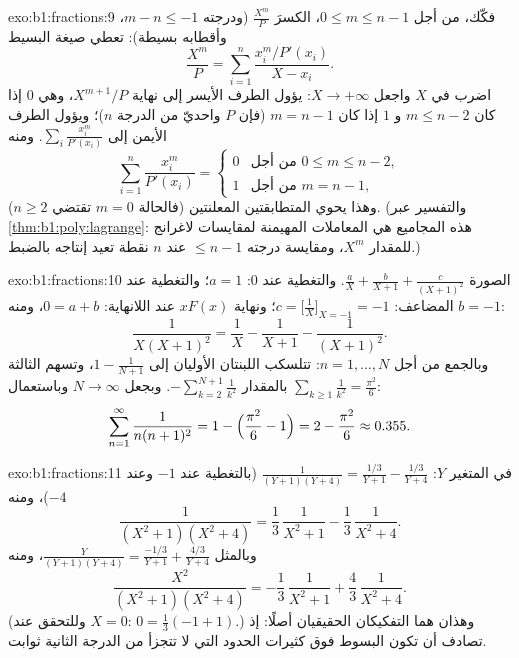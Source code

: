 \begin{solution}{exo:b1:fractions:9}
فكّك، من أجل $0 \leq m \leq n - 1$، الكسرَ $\frac{X^m}{P}$
(ودرجته $m - n \leq -1$، وأقطابه بسيطة): تعطي صيغة  البسيط
\[
\frac{X^m}{P} = \sum_{i=1}^{n} \frac{x_i^m / P'(x_i)}{X - x_i} .
\]
اضرب في $X$ واجعل $X \to +\infty$: يؤول الطرف الأيسر إلى
نهاية $X^{m+1}/P$، وهي $0$ إذا كان $m \leq n - 2$ و $1$ إذا كان $m =
n - 1$ (فإن $P$ واحديّ من الدرجة $n$)؛ ويؤول الطرف الأيمن إلى
$\sum_i \frac{x_i^m}{P'(x_i)}$. ومنه
\[
\sum_{i=1}^{n} \frac{x_i^{m}}{P'(x_i)} =
\begin{cases}
0 & \text{من أجل } 0 \leq m \leq n-2,\\
1 & \text{من أجل } m = n - 1,
\end{cases}
\]
وهذا يحوي المتطابقتين المعلنتين (فالحالة $m = 0$ تقتضي $n \geq
2$). (والتفسير عبر \cref{thm:b1:poly:lagrange}: هذه المجاميع هي
المعاملات المهيمنة لمقايسات لاغرانج للمقدار $X^m$، ومقايسة
 درجته $\leq n-1$ عند $n$ نقطة
تعيد إنتاجه بالضبط.)
\end{solution}

\begin{solution}{exo:b1:fractions:10}
الصورة $\frac aX + \frac b{X+1} + \frac c{(X+1)^2}$. والتغطية عند
$0$: $a = 1$؛ والتغطية عند  المضاعف: $c = \bigl[\frac1X
\bigr]_{X=-1} = -1$؛ ونهاية $xF(x)$ عند اللانهاية: $0 = a + b$، ومنه
$b = -1$:
\[
\frac{1}{X(X+1)^2} = \frac1X - \frac1{X+1} - \frac1{(X+1)^2} .
\]
وبالجمع من أجل $n = 1, \dots, N$: تتلسكب اللبنتان الأوليان إلى
$1 - \frac1{N+1}$، وتسهم الثالثة بالمقدار $-\sum_{k=2}^{N+1}
\frac1{k^2}$. وبجعل $N \to \infty$ وباستعمال $\sum_{k\geq1}
\frac1{k^2} = \frac{\pi^2}6$:
\[
\sum_{n=1}^{\infty}\frac{1}{n(n+1)^2}
= 1 - \Bigl(\frac{\pi^2}6 - 1\Bigr) = 2 - \frac{\pi^2}6
\approx 0.355 .
\]
\end{solution}

\begin{solution}{exo:b1:fractions:11}
في المتغير $Y$: $\frac1{(Y+1)(Y+4)} = \frac{1/3}{Y+1} -
\frac{1/3}{Y+4}$ (بالتغطية عند $-1$ وعند $-4$)، ومنه
\[
\frac{1}{(X^2+1)(X^2+4)}
= \frac13\,\frac1{X^2+1} - \frac13\,\frac1{X^2+4} .
\]
وبالمثل $\frac{Y}{(Y+1)(Y+4)} = \frac{-1/3}{Y+1} +
\frac{4/3}{Y+4}$، ومنه
\[
\frac{X^2}{(X^2+1)(X^2+4)}
= -\frac13\,\frac1{X^2+1} + \frac43\,\frac1{X^2+4} .
\]
(وللتحقق عند $X = 0$: $0 = \frac13(-1 + 1)$.) وهذان هما
التفكيكان الحقيقيان أصلًا: إذ تصادف أن تكون البسوط فوق كثيرات الحدود
التي لا تتجزأ من الدرجة الثانية ثوابت.
\end{solution}

